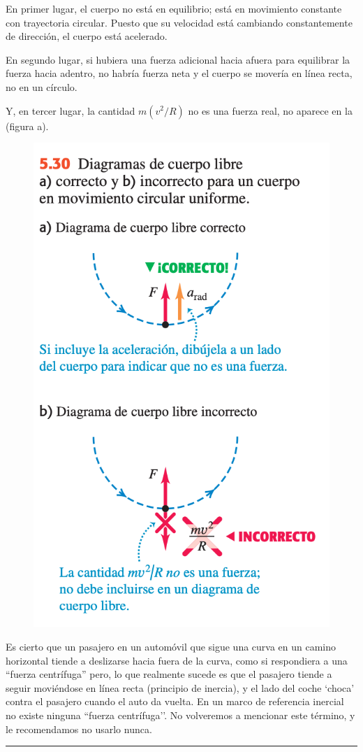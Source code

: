 \begin{multicols}{2}
En primer lugar, el cuerpo no está en equilibrio; está en movimiento constante con trayectoria circular. Puesto que su velocidad está cambiando constantemente de dirección, el cuerpo está acelerado. 

En segundo lugar, si hubiera una fuerza adicional hacia afuera para equilibrar la fuerza hacia adentro, no habría fuerza neta y el cuerpo se movería en línea recta, no en un círculo.

Y, en tercer lugar, la cantidad $m(v^2/R)$ no es una fuerza real, no aparece en la (figura a). 

\begin{figure}[H]
	\centering
	\includegraphics[width=.45\textwidth]{imagenes/imagenes03/T03IM41.png}
	\end{figure}
\end{multicols}
Es cierto que un pasajero en un automóvil que sigue una curva en un camino horizontal tiende a deslizarse hacia fuera de la curva, como si respondiera a una “fuerza centrífuga” pero, lo que realmente sucede es que el pasajero tiende a seguir moviéndose en línea recta (principio de inercia), y el lado del coche `choca’ contra el pasajero cuando el auto da vuelta. En un marco de referencia inercial no existe ninguna ``fuerza centrífuga’’. No volveremos a mencionar este término, y le recomendamos no usarlo nunca. 

\rule{150 pt}{0.4 pt}


